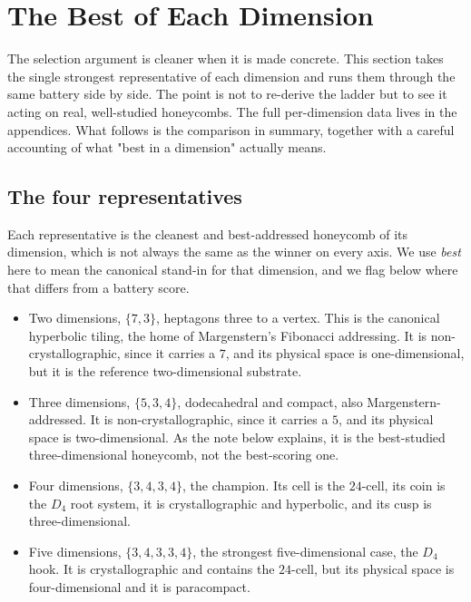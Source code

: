 \section{The Best of Each Dimension}

The selection argument is cleaner when it is made concrete. This section takes the single strongest
representative of each dimension and runs them through the same battery side by side. The point is not to
re-derive the ladder but to see it acting on real, well-studied honeycombs. The full per-dimension data lives in
the appendices. What follows is the comparison in summary, together with a careful accounting of what "best in a
dimension" actually means.

\subsection{The four representatives}

Each representative is the cleanest and best-addressed honeycomb of its dimension, which is not always the same as
the winner on every axis. We use \emph{best} here to mean the canonical stand-in for that dimension, and we flag
below where that differs from a battery score.

\begin{itemize}
  \item Two dimensions, $\{7,3\}$, heptagons three to a vertex. This is the canonical hyperbolic tiling, the home
  of Margenstern's Fibonacci addressing. It is non-crystallographic, since it carries a $7$, and its physical
  space is one-dimensional, but it is the reference two-dimensional substrate.
  \item Three dimensions, $\{5,3,4\}$, dodecahedral and compact, also Margenstern-addressed. It is
  non-crystallographic, since it carries a $5$, and its physical space is two-dimensional. As the note below
  explains, it is the best-studied three-dimensional honeycomb, not the best-scoring one.
  \item Four dimensions, $\{3,4,3,4\}$, the champion. Its cell is the $24$-cell, its coin is the $D_4$ root
  system, it is crystallographic and hyperbolic, and its cusp is three-dimensional.
  \item Five dimensions, $\{3,4,3,3,4\}$, the strongest five-dimensional case, the $D_4$ hook. It is
  crystallographic and contains the $24$-cell, but its physical space is four-dimensional and it is paracompact.
\end{itemize}

